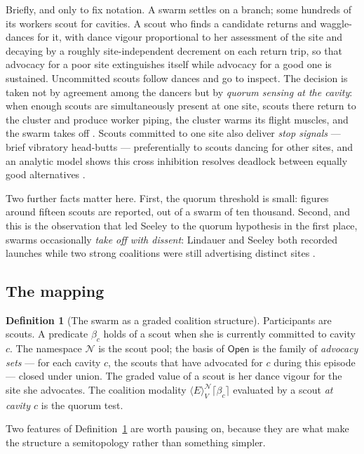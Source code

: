 \documentclass[11pt,a4paper]{article}
\theoremstyle{plain}
\theoremstyle{definition}
\newtheorem{definition}[theorem]{Definition}
\theoremstyle{remark}
\newcommand{\Open}{\mathsf{Open}}
\newcommand{\gE}[2]{\langle E\rangle^{#1}_{#2}}
\newcommand{\Nsp}{\mathcal{N}}
\newcommand{\Val}{V}
\begin{document}
Briefly, and only to fix notation. A swarm settles on a branch; some hundreds
of its workers scout for cavities. A scout who finds a candidate returns and
waggle-dances for it, with dance vigour proportional to her assessment of the
site and decaying by a roughly site-independent decrement on each return trip,
so that advocacy for a poor site extinguishes itself while advocacy for a good
one is sustained. Uncommitted scouts follow dances and go to inspect. The
decision is taken not by agreement among the dancers but by \emph{quorum
sensing at the cavity}: when enough scouts are simultaneously present at one
site, scouts there return to the cluster and produce worker piping, the cluster
warms its flight muscles, and the swarm takes off \cite{SV04,Seeley10}. Scouts
committed to one site also deliver \emph{stop signals} --- brief vibratory
head-butts --- preferentially to scouts dancing for other sites, and an analytic
model shows this cross inhibition resolves deadlock between equally good
alternatives \cite{Seeley12}.

Two further facts matter here. First, the quorum threshold is small: figures
around fifteen scouts are reported, out of a swarm of ten thousand. Second, and
this is the observation that led Seeley to the quorum hypothesis in the first
place, swarms occasionally \emph{take off with dissent}: Lindauer and Seeley
both recorded launches while two strong coalitions were still advertising
distinct sites \cite{Seeley10}.

\subsection{The mapping}

\begin{definition}[The swarm as a graded coalition structure]\label{def:swarmmap}
Participants are scouts. A predicate $\beta_c$ holds of a scout when she is
currently committed to cavity $c$. The namespace $\Nsp$ is the scout pool; the
basis of $\Open$ is the family of \emph{advocacy sets} --- for each cavity $c$,
the scouts that have advocated for $c$ during this episode --- closed under
union. The graded value of a scout is her dance vigour for the site she
advocates. The coalition modality $\gE{\Nsp}{\Val}\lceil\beta_c\rceil$
evaluated by a scout \emph{at cavity $c$} is the quorum test.
\end{definition}

Two features of Definition~\ref{def:swarmmap} are worth pausing on, because
they are what make the structure a semitopology rather than something simpler.
\end{document}

